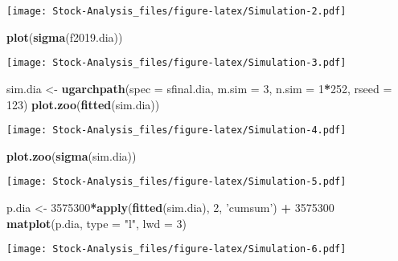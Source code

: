 \documentclass[
]{article}
\newenvironment{Shaded}{\begin{snugshade}}{\end{snugshade}}
\newcommand{\DataTypeTok}[1]{\textcolor[rgb]{0.13,0.29,0.53}{#1}}
\newcommand{\DecValTok}[1]{\textcolor[rgb]{0.00,0.00,0.81}{#1}}
\newcommand{\KeywordTok}[1]{\textcolor[rgb]{0.13,0.29,0.53}{\textbf{#1}}}
\newcommand{\NormalTok}[1]{#1}
\newcommand{\OperatorTok}[1]{\textcolor[rgb]{0.81,0.36,0.00}{\textbf{#1}}}
\newcommand{\StringTok}[1]{\textcolor[rgb]{0.31,0.60,0.02}{#1}}
\begin{document}
\texttt{[image: Stock-Analysis\_files/figure-latex/Simulation-2.pdf]}

\begin{Shaded}
\begin{Highlighting}[]
\KeywordTok{plot}\NormalTok{(}\KeywordTok{sigma}\NormalTok{(f2019.dia))}
\end{Highlighting}
\end{Shaded}

\texttt{[image: Stock-Analysis\_files/figure-latex/Simulation-3.pdf]}

\begin{Shaded}
\begin{Highlighting}[]
\NormalTok{sim.dia <-}\StringTok{ }\KeywordTok{ugarchpath}\NormalTok{(}\DataTypeTok{spec =}\NormalTok{ sfinal.dia,}
                  \DataTypeTok{m.sim =} \DecValTok{3}\NormalTok{,}
                  \DataTypeTok{n.sim =} \DecValTok{1}\OperatorTok{*}\DecValTok{252}\NormalTok{,}
                  \DataTypeTok{rseed =} \DecValTok{123}\NormalTok{)}
\KeywordTok{plot.zoo}\NormalTok{(}\KeywordTok{fitted}\NormalTok{(sim.dia))}
\end{Highlighting}
\end{Shaded}

\texttt{[image: Stock-Analysis\_files/figure-latex/Simulation-4.pdf]}

\begin{Shaded}
\begin{Highlighting}[]
\KeywordTok{plot.zoo}\NormalTok{(}\KeywordTok{sigma}\NormalTok{(sim.dia))}
\end{Highlighting}
\end{Shaded}

\texttt{[image: Stock-Analysis\_files/figure-latex/Simulation-5.pdf]}

\begin{Shaded}
\begin{Highlighting}[]
\NormalTok{p.dia <-}\StringTok{ }\DecValTok{3575300}\OperatorTok{*}\KeywordTok{apply}\NormalTok{(}\KeywordTok{fitted}\NormalTok{(sim.dia), }\DecValTok{2}\NormalTok{, }\StringTok{'cumsum'}\NormalTok{) }\OperatorTok{+}\StringTok{ }\DecValTok{3575300}
\KeywordTok{matplot}\NormalTok{(p.dia, }\DataTypeTok{type =} \StringTok{"l"}\NormalTok{, }\DataTypeTok{lwd =} \DecValTok{3}\NormalTok{)}
\end{Highlighting}
\end{Shaded}

\texttt{[image: Stock-Analysis\_files/figure-latex/Simulation-6.pdf]}
\end{document}
